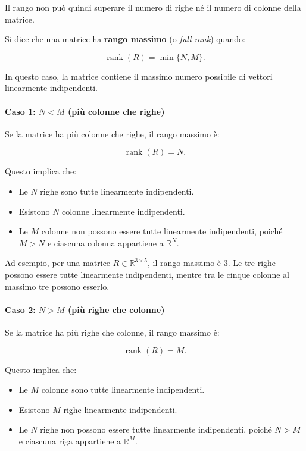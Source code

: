 Il rango non può quindi superare il numero di righe né il numero di colonne della matrice.

Si dice che una matrice ha \textbf{rango massimo} (o \textit{full rank}) quando:

\[
    \boxed{\operatorname{rank}(R) = \min\{N,M\}.}
\]

In questo caso, la matrice contiene il massimo numero possibile di vettori linearmente indipendenti.

\paragraph{Caso 1: $N < M$ (più colonne che righe)}

Se la matrice ha più colonne che righe, il rango massimo è:

\[
    \operatorname{rank}(R) = N.
\]

Questo implica che:
\begin{itemize}
    \item Le $N$ righe sono tutte linearmente indipendenti.
    \item Esistono $N$ colonne linearmente indipendenti.
    \item Le $M$ colonne non possono essere tutte linearmente indipendenti, poiché $M > N$ e ciascuna colonna appartiene a $\mathbb{R}^N$.
\end{itemize}

Ad esempio, per una matrice $R \in \mathbb{R}^{3 \times 5}$, il rango massimo è $3$. Le tre righe possono essere tutte linearmente indipendenti, mentre tra le cinque colonne al massimo tre possono esserlo.

\paragraph{Caso 2: $N > M$ (più righe che colonne)}

Se la matrice ha più righe che colonne, il rango massimo è:

\[
    \operatorname{rank}(R) = M.
\]

Questo implica che:
\begin{itemize}
    \item Le $M$ colonne sono tutte linearmente indipendenti.
    \item Esistono $M$ righe linearmente indipendenti.
    \item Le $N$ righe non possono essere tutte linearmente indipendenti, poiché $N > M$ e ciascuna riga appartiene a $\mathbb{R}^M$.
\end{itemize}

